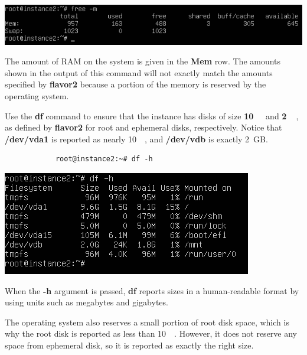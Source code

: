 \documentclass[letterpaper, 12pt]{article}
\begin{document}
\begin{enumerate}
\begin{labstep}
        \begin{center}
            \includegraphics[width=\linewidth]{images/part5/step7.png}
        \end{center}
    \end{labstep}

    \begin{notebox}
        The amount of RAM on the system is given in the \textbf{Mem} row.
        The amounts shown in the output of this command will not exactly match the amounts specified by \textbf{flavor2} because a portion of the memory is reserved by the operating system.
    \end{notebox}

    \begin{labstep}
        Use the \textbf{df} command to ensure that the instance has disks of size \textbf{\qty{10}{\giga\byte}} and \textbf{\qty{2}{\giga\byte}}, as defined by \textbf{flavor2} for root and ephemeral disks, respectively.
        Notice that \textbf{/dev/vda1} is reported as nearly \qty{10}{\giga\byte}, and \textbf{/dev/vdb} is exactly \qty{2}{GB}.
        \begin{lstlisting}
            root@instance2:~# df -h
        \end{lstlisting}

        \begin{center}
            \includegraphics[width=\linewidth]{images/part5/step8.png}
        \end{center}
    \end{labstep}

    \begin{notebox}
        When the \textbf{-h} argument is passed, \textbf{df} reports sizes in a human-readable format by using units such as megabytes and gigabytes.
    \end{notebox}
    \begin{notebox}
        The operating system also reserves a small portion of root disk space, which is why the root disk is reported as less than \qty{10}{\giga\byte}.
        However, it does not reserve any space from ephemeral disk, so it is reported as exactly the right size.
    \end{notebox}


\end{enumerate}
\end{document}
